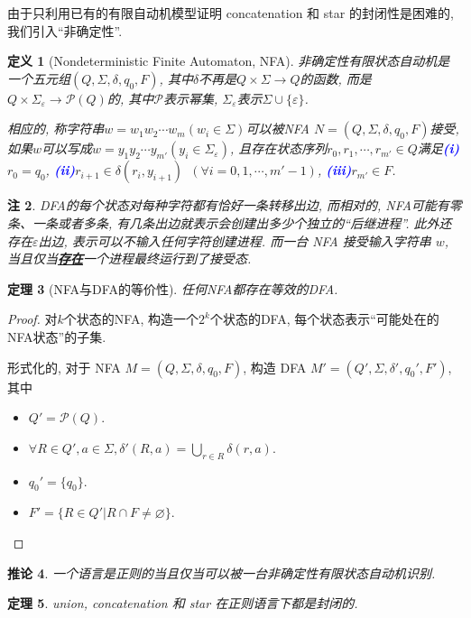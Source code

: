 \documentclass[8pt]{article}
\theoremstyle{compact}
\newtheorem{theorem}{定理}[section]
\newtheorem{definition}[theorem]{定义}
\newtheorem{corollary}[theorem]{推论}
\newtheorem{remark}[theorem]{注}
\def\obj#1{\textbf{\uline{#1}}}
\def\num#1{\textnormal{\textbf{\mbox{\textcolor{blue}{(#1)}}}}}
\begin{document}
由于只利用已有的有限自动机模型证明 concatenation 和 star 的封闭性是困难的, 我们引入“非确定性”. 
\begin{definition}[Nondeterministic Finite Automaton, NFA]
	非确定性有限状态自动机是一个五元组$(Q, \Sigma, \delta, q_0, F)$, 其中$\delta$不再是$Q \times \Sigma \to Q$的函数, 而是$Q \times \Sigma_{\varepsilon} \to \mathcal P(Q)$的, 其中$\mathcal P$表示幂集, $\Sigma_{\varepsilon}$表示$\Sigma \cup \{\varepsilon\}$. 

	相应的, 称字符串$w = w_1w_2\cdots w_m(w_i \in \Sigma)$可以被NFA $N = (Q, \Sigma, \delta, q_0, F)$接受, 如果$w$可以写成$w = y_1y_2\cdots y_{m'}(y_i \in \Sigma_{\varepsilon})$, 且存在状态序列$r_0, r_1, \cdots, r_{m'} \in Q$满足\num{i}$r_0 = q_0$, \num{ii}$r_{i+1} \in \delta(r_i, y_{i+1})$\ $(\forall i = 0, 1, \cdots, {m'}-1)$, \num{iii}$r_{m'} \in F$. 
\end{definition}
\begin{remark}
	DFA的每个状态对每种字符都有恰好一条转移出边, 而相对的, NFA可能有零条、一条或者多条, 有几条出边就表示会创建出多少个独立的“后继进程”. 此外还存在$\varepsilon$出边, 表示可以不输入任何字符创建进程. 而一台 NFA 接受输入字符串 $w$, 当且仅当\obj{存在}一个进程最终运行到了接受态. 
\end{remark}
\begin{theorem}[NFA与DFA的等价性]
	任何NFA都存在等效的DFA. 
\end{theorem}
\begin{proof}
	对$k$个状态的NFA, 构造一个$2^k$个状态的DFA, 每个状态表示“可能处在的NFA状态”的子集. 

	形式化的, 对于 NFA $M = (Q, \Sigma, \delta, q_0, F)$, 构造 DFA $M' = (Q', \Sigma, \delta', q_0', F')$, 其中
	\begin{itemize}
		\item $Q' = \mathcal P(Q)$.
		\item $\forall R \in Q', a \in \Sigma, \delta'(R, a) = \bigcup_{r \in R}\delta(r, a)$.
		\item $q_0' = \{q_0\}$.
		\item $F' = \{R \in Q' | R \cap F \neq \varnothing\}$.
	\end{itemize}
\end{proof}
\begin{corollary}
	一个语言是正则的当且仅当可以被一台非确定性有限状态自动机识别. 
\end{corollary}
\begin{theorem}
	union, concatenation 和 star 在正则语言下都是封闭的. 
\end{theorem}
\end{document}
